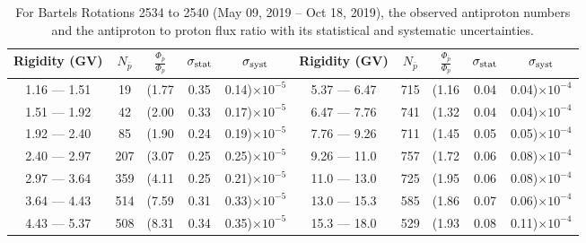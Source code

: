 \begin{table}[p] 
\renewcommand\baselinestretch{1.3}\selectfont
\setlength\tabcolsep{3pt}
\centering
\begin{tabular}{ccccc | ccccc}
\hline
\textbf{Rigidity}  (GV)  & $N_{\bar{p}}$ & $\frac{\Phi_{\bar{p}}}{\Phi_{p}}$ & $\sigma_{\rm{stat}}$ & $\sigma_{\rm{syst}}$ \hspace{1cm}   & \textbf{Rigidity}  (GV)  & $N_{\bar{p}}$ & $\frac{\Phi_{\bar{p}}}{\Phi_{p}}$ & $\sigma_{\rm{stat}}$ & $\sigma_{\rm{syst}}$ \hspace{1cm} \\ 
\hline
1.16 — 1.51   &  19                  &(1.77                          &  0.35              &      0.14)$\times 10^{-5}$  & 5.37 — 6.47                &  715                    &(1.16                               &  0.04                   &      0.04)$\times 10^{-4}$\\
1.51 — 1.92   &  42                  &(2.00                          &  0.33              &      0.17)$\times 10^{-5}$  & 6.47 — 7.76                &  741                    &(1.32                               &  0.04                   &      0.04)$\times 10^{-4}$\\
1.92 — 2.40   &  85                  &(1.90                          &  0.24              &      0.19)$\times 10^{-5}$  & 7.76 — 9.26                &  711                    &(1.45                                &  0.05                   &      0.05)$\times 10^{-4}$\\    
2.40 — 2.97   &  207                &(3.07                          &  0.25              &      0.25)$\times 10^{-5}$  & 9.26 — 11.0                &  757                    &(1.72                                &  0.06                   &      0.08)$\times 10^{-4}$\\    
2.97 — 3.64   &  359                &(4.11                          &  0.25              &      0.21)$\times 10^{-5}$  & 11.0 — 13.0                 &  725                    &(1.95                                &  0.06                   &      0.08)$\times 10^{-4}$\\
3.64 — 4.43   &  514                &(7.59                          &  0.31              &      0.33)$\times 10^{-5}$  & 13.0 — 15.3               &  585                    &(1.86                                &  0.07                   &      0.06)$\times 10^{-4}$\\
4.43 — 5.37   &  508                &(8.31                          &  0.34              &      0.35)$\times 10^{-5}$  & 15.3 — 18.0               &  529                    &(1.93                                &  0.08                   &      0.11)$\times 10^{-4}$\\
\hline
\end{tabular}
\caption[Antiproton to proton flux ratio for Bartels Rotations 2534 to 2540]{For Bartels Rotations 2534 to 2540 (May 09, 2019 – Oct 18, 2019), the observed antiproton numbers and the antiproton to proton flux ratio with its statistical and systematic uncertainties.}
\label{TableOfDependent19}
\end{table}

